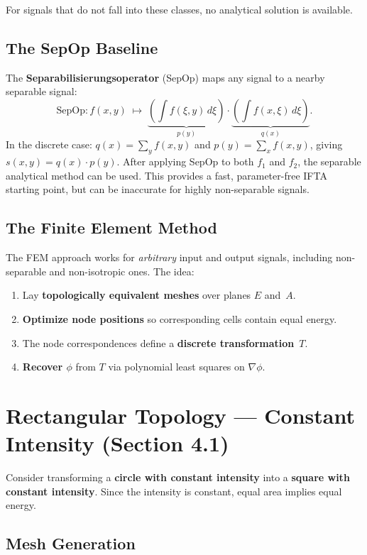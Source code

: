 \documentclass[11pt,a4paper]{article}
\begin{document}
For signals that do not fall into these classes, no analytical solution is available.

\subsection{The SepOp Baseline}

The \textbf{Separabilisierungsoperator} (SepOp) maps any signal to a nearby separable signal:
\[
  \mathrm{SepOp}\colon f(x,y) \;\mapsto\; 
  \underbrace{\left(\int f(\xi,y)\,d\xi\right)}_{p(y)} \cdot 
  \underbrace{\left(\int f(x,\xi)\,d\xi\right)}_{q(x)}.
\]
In the discrete case: $q(x) = \sum_y f(x,y)$ and $p(y) = \sum_x f(x,y)$, 
giving $s(x,y) = q(x)\cdot p(y)$. After applying SepOp to both $f_1$ and $f_2$,
the separable analytical method can be used. This provides a fast, parameter-free
IFTA starting point, but can be inaccurate for highly non-separable signals.

\subsection{The Finite Element Method}

The FEM approach works for \emph{arbitrary} input and output signals, including 
non-separable and non-isotropic ones. The idea:
\begin{enumerate}
  \item Lay \textbf{topologically equivalent meshes} over planes $E$ and~$A$.
  \item \textbf{Optimize node positions} so corresponding cells contain equal energy.
  \item The node correspondences define a \textbf{discrete transformation}~$T$.
  \item \textbf{Recover $\phi$} from $T$ via polynomial least squares on $\nabla\phi$.
\end{enumerate}

\section{Rectangular Topology --- Constant Intensity (Section 4.1)}

Consider transforming a \textbf{circle with constant intensity} into a 
\textbf{square with constant intensity}. Since the intensity is constant, 
equal area implies equal energy.

\subsection{Mesh Generation}
\end{document}
